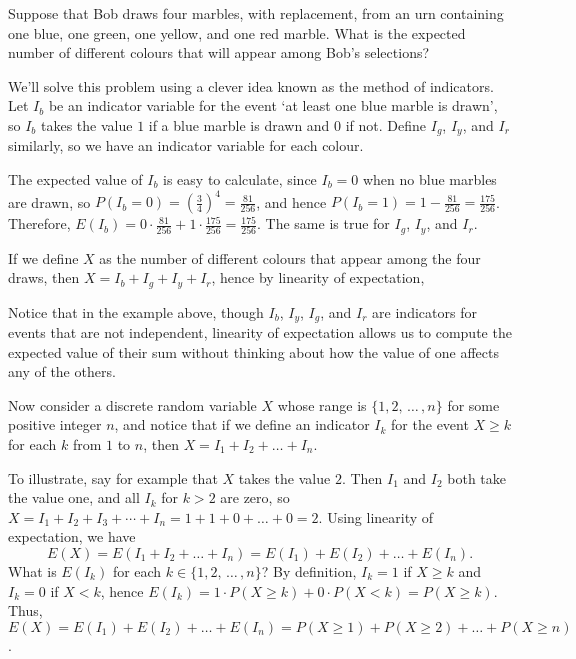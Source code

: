 \begin{examp}
Suppose that Bob draws four marbles, with replacement, from an urn containing one blue, one green, one yellow, and one red marble. What is the expected number of different colours that will appear among Bob's selections?
\par
\noindent We'll solve this problem using a clever idea known as the method of indicators. Let $I_b$ be an indicator variable for the event `at least one blue marble is drawn', so $I_b$ takes the value $1$ if a blue marble is drawn and $0$ if not. Define $I_g$, $I_y$, and $I_r$ similarly, so we have an indicator variable for each colour.
\par
\noindent The expected value of $I_b$ is easy to calculate, since $I_b = 0$ when no blue marbles are drawn, so $P(I_b = 0) = (\frac{3}{4})^4 = \frac{81}{256}$, and hence $P(I_b = 1) = 1 - \frac{81}{256} = \frac{175}{256}$. Therefore, $E(I_b) = 0 \cdot \frac{81}{256} + 1 \cdot \frac{175}{256} =\frac{175}{256}$. The same is true for $I_g$, $I_y$, and $I_r$.
\par
\noindent If we define $X$ as the number of different colours that appear among the four draws, then $X = I_b + I_g + I_y + I_r$, hence by linearity of expectation,
\end{examp}
\par
Notice that in the example above, though $I_b$, $I_y$, $I_g$, and $I_r$ are indicators for events that are not independent, linearity of expectation allows us to compute the expected value of their sum without thinking about how the value of one affects any of the others.
\par
Now consider a discrete random variable $X$ whose range is $\{1,2,\,\dots\,,n\}$ for some positive integer $n$, and notice that if we define an indicator $I_k$ for the event $X \geq k$ for each $k$ from $1$ to $n$, then $X = I_1 + I_2 + \dots + I_n.$
\par
To illustrate, say for example that $X$ takes the value $2$. Then $I_1$ and $I_2$ both take the value one, and all $I_k$ for $k > 2$ are zero, so $X = I_1 + I_2 + I_3 + \cdots + I_n = 1 + 1 + 0 + \dots + 0 = 2$. Using linearity of expectation, we have $$E(X) = E(I_1 + I_2 + \dots + I_n) = E(I_1) + E(I_2) + \dots + E(I_n).$$
What is $E(I_k)$ for each $k \in \{1,2,\,\dots\,,n\}$? By definition, $I_k = 1$ if $X \geq k$ and $I_k = 0$ if $X < k$, hence $E(I_k) = 1\cdot P(X \geq k) + 0\cdot P(X<k) = P(X \geq k)$. Thus, $E(X) = E(I_1) + E(I_2) + \dots + E(I_n) = P(X\geq 1) +P(X\geq 2) + \dots + P(X\geq n)$.

